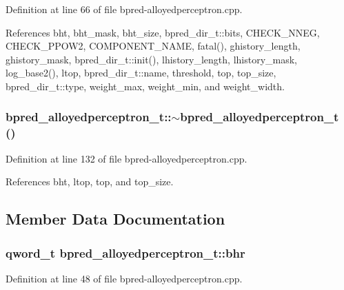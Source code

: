 Definition at line 66 of file bpred-alloyedperceptron.cpp.

References bht, bht\_\-mask, bht\_\-size, bpred\_\-dir\_\-t::bits, CHECK\_\-NNEG, CHECK\_\-PPOW2, COMPONENT\_\-NAME, fatal(), ghistory\_\-length, ghistory\_\-mask, bpred\_\-dir\_\-t::init(), lhistory\_\-length, lhistory\_\-mask, log\_\-base2(), ltop, bpred\_\-dir\_\-t::name, threshold, top, top\_\-size, bpred\_\-dir\_\-t::type, weight\_\-max, weight\_\-min, and weight\_\-width.
\subsubsection[{$\sim$bpred\_\-alloyedperceptron\_\-t}]{\setlength{\rightskip}{0pt plus 5cm}bpred\_\-alloyedperceptron\_\-t::$\sim$bpred\_\-alloyedperceptron\_\-t ()\hspace{0.3cm}{\tt  [inline]}}\label{classbpred__alloyedperceptron__t_02d80ab5de7a8777362ef612fbfa74d3}




Definition at line 132 of file bpred-alloyedperceptron.cpp.

References bht, ltop, top, and top\_\-size.

\subsection{Member Data Documentation}
\subsubsection[{bhr}]{\setlength{\rightskip}{0pt plus 5cm}qword\_\-t {\bf bpred\_\-alloyedperceptron\_\-t::bhr}\hspace{0.3cm}{\tt  [protected]}}\label{classbpred__alloyedperceptron__t_dc77ee5356225426ea9c22605ab4fb74}




Definition at line 48 of file bpred-alloyedperceptron.cpp.
